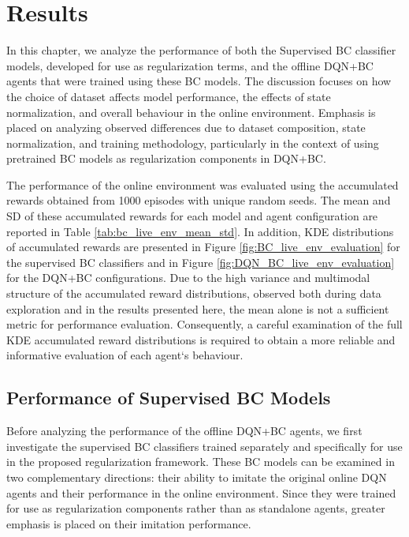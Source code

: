 \cleardoubleoddpage
\chapter{Results}
\label{app:results}

In this chapter, we analyze the performance of both the Supervised BC classifier models, developed for use as regularization terms, and the offline DQN+BC agents that were trained using these BC models. The discussion focuses on how the choice of dataset affects model performance, the effects of state normalization, and overall behaviour in the online environment. Emphasis is placed on analyzing observed differences due to dataset composition, state normalization, and training methodology, particularly in the context of using pretrained BC models as regularization components in DQN+BC.

The performance of the online environment was evaluated using the accumulated rewards obtained from 1000 episodes with unique random seeds. The mean and SD of these accumulated rewards for each model and agent configuration are reported in Table \ref{tab:bc_live_env_mean_std}. In addition, KDE distributions of accumulated rewards are presented in Figure \ref{fig:BC_live_env_evaluation} for the supervised BC classifiers and in Figure \ref{fig:DQN_BC_live_env_evaluation} for the DQN+BC configurations. Due to the high variance and multimodal structure of the accumulated reward distributions, observed both during data exploration and in the results presented here, the mean alone is not a sufficient metric for performance evaluation. Consequently, a careful examination of the full KDE accumulated reward distributions is required to obtain a more reliable and informative evaluation of each agent`s behaviour.

\section{Performance of Supervised BC Models}
Before analyzing the performance of the offline DQN+BC agents, we first investigate the supervised BC classifiers trained separately and specifically for use in the proposed regularization framework. These BC models can be examined in two complementary directions: their ability to imitate the original online DQN agents and their performance in the online environment. Since they were trained for use as regularization components rather than as standalone agents, greater emphasis is placed on their imitation performance.

